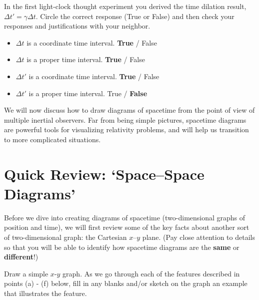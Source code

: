 \documentclass[11pt, letterpaper, openany]{book}
\newenvironment{exercise}[1][Exercise]{%
  \tcolorbox[blanker, breakable, left=1em,
    before skip=1em, after skip=1em,
    borderline west={3pt}{0pt}{PhysNavy},
    colback=PhysCream,
    before upper={\textcolor{PhysNavy}{\sffamily\bfseries #1:}\space}
  ]%
}{%
  \endtcolorbox%
}
\begin{document}
\begin{exercise}[Quick Questions]
In the first light-clock thought experiment you derived the time dilation result, $\Delta t' = \gamma \Delta t$. Circle the correct response (True or False) and then check your responses and justifications with your neighbor.

\begin{itemize}
    \item $\Delta t$ is a coordinate time interval. \qquad \textbf{True} / False
    \item $\Delta t$ is a proper time interval. \qquad \textbf{True} / False
    \item $\Delta t'$ is a coordinate time interval. \qquad \textbf{True} / False
    \item $\Delta t'$ is a proper time interval. \qquad True / \textbf{False}
\end{itemize}
\end{exercise}

We will now discuss how to draw diagrams of spacetime from the point of view of multiple inertial observers. Far from being simple pictures, spacetime diagrams are powerful tools for visualizing relativity problems, and will help us transition to more complicated situations.

\section{Quick Review: `Space--Space Diagrams'}

Before we dive into creating diagrams of spacetime (two-dimensional graphs of position and time), we will first review some of the key facts about another sort of two-dimensional graph: the Cartesian $x$--$y$ plane. (Pay close attention to details so that you will be able to identify how spacetime diagrams are the \textbf{same} or \textbf{different}!)

\begin{exercise}[Exercise 1]
Draw a simple $x$-$y$ graph. As we go through each of the features described in points (a) - (f) below, fill in any blanks and/or sketch on the graph an example that illustrates the feature.
\end{exercise}
\end{document}
